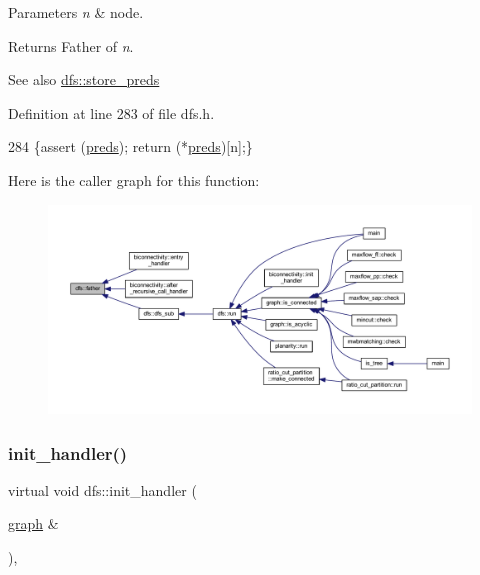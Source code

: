 \begin{DoxyParams}{Parameters}
{\em n} & node. \\
\hline
\end{DoxyParams}
\begin{DoxyReturn}{Returns}
Father of {\itshape n}. 
\end{DoxyReturn}
\begin{DoxySeeAlso}{See also}
\mbox{\hyperlink{classdfs_a7043f46eb3887cbcbb1391fc783407a4}{dfs\+::store\+\_\+preds}} 
\end{DoxySeeAlso}


Definition at line 283 of file dfs.\+h.


\begin{DoxyCode}
284     \{assert (\mbox{\hyperlink{classdfs_a3fdeb5a211a1bc1753b2a637258c5355}{preds}}); \textcolor{keywordflow}{return} (*\mbox{\hyperlink{classdfs_a3fdeb5a211a1bc1753b2a637258c5355}{preds}})[n];\}
\end{DoxyCode}
Here is the caller graph for this function\+:
\nopagebreak
\begin{figure}[H]
\begin{center}
\leavevmode
\includegraphics[width=350pt]{classdfs_a3012717ce541b3e56943e2c2c50efdf6_icgraph}
\end{center}
\end{figure}
\mbox{\label{classdfs_aae46a50d0c73c63bf72e483668fd22a2}} 
\subsubsection{\texorpdfstring{init\+\_\+handler()}{init\_handler()}}
{\footnotesize\ttfamily virtual void dfs\+::init\+\_\+handler (\begin{DoxyParamCaption}\item[{\mbox{\hyperlink{classgraph}{graph}} \&}]{ }\end{DoxyParamCaption})\hspace{0.3cm}{\ttfamily [inline]}, {\ttfamily [virtual]}}



